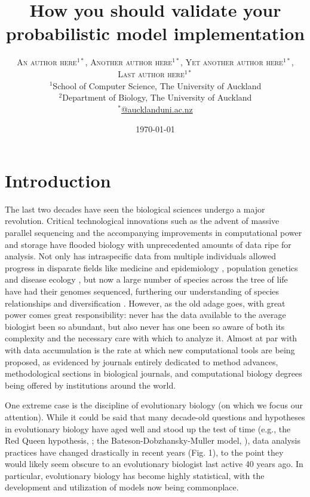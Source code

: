 \documentclass[oneside,twocolumn]{article}
\title{How you should validate your probabilistic model implementation} %
\author{\textsc{An author here$^{1*}$}, \textsc{Another author
    here$^{1*}$}, \textsc{Yet another author here$^{1*}$}, \\
  \textsc{Last author here$^{1*}$} \\
\small $^1$School of Computer Science, The University of Auckland\\
\small $^2$Department of Biology, The University of Auckland\\
\small \href{mailto:@aucklanduni.ac.nz}{$^*$@aucklanduni.ac.nz}
}
\date{\today} %
\begin{document}
\maketitle


\section*{Introduction}
The last two decades have seen the biological sciences undergo a major revolution.
Critical technological innovations such as the advent of massive parallel sequencing and the accompanying improvements in computational power and storage have flooded biology with unprecedented amounts of data ripe for analysis.
Not only has intraspecific data from multiple individuals allowed
progress in disparate fields like medicine and epidemiology
\citep[e.g.,][]{1000g,humanmicrobiome,neafsey15}, population genetics \citep[e.g.,][]{lynch07,lack16,demanuel16} and disease ecology \citep[e.g.][]{rosenblum13,bates18}, but now a large number of species across the tree of life have had their genomes sequenced, furthering our understanding of species relationships and diversification \citep[e.g.,][]{Martin_Genome_2013,brawand14,jarvis14,novikova16,Pease2016}.
However, as the old adage goes, with great power comes great responsibility: never has the data available to the average biologist been so abundant, but also never has one been so aware of both its complexity and the necessary care with which to analyze it.
Almost at par with with data accumulation is the rate at which new computational tools are being proposed, as evidenced by journals entirely dedicated to method advances, methodological sections in biological journals, and computational biology degrees being offered by institutions around the world.

One extreme case is the discipline of evolutionary biology (on which we focus our attention).
While it could be said that many decade-old questions and hypotheses
in evolutionary biology have aged well and stood up the test of time
(e.g., the Red Queen hypothesis,
\citealt{vanvalen73,lively87,morran11,gibson15}; the
Bateson-Dobzhansky-Muller model, \citealt{dob36,muller40,hopkins12,roda17}), data analysis
practices have changed drastically in recent years (Fig. 1), to the
point they would likely seem obscure to an evolutionary biologist last active 40 years ago.
In particular, evolutionary biology has become highly statistical, with the development and utilization of models now being commonplace.
\end{document}
